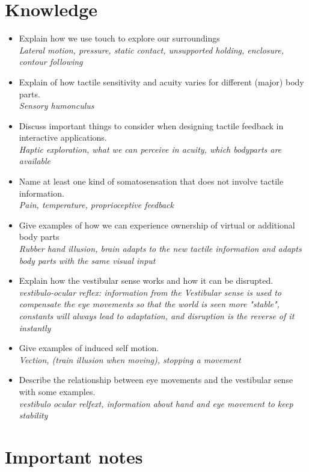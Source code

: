 \documentclass{article}
\begin{document}
\section{Knowledge}
\begin{itemize}
    \item Explain how we use touch to explore our surroundings\\
        \textit{Lateral motion, pressure, static contact, unsupported holding, enclosure, contour following}
    \item Explain of how tactile sensitivity and acuity varies for different (major) body parts.\\
        \textit{Sensory humonculus}
    \item Discuss important things to consider when designing tactile feedback in interactive applications.\\
        \textit{Haptic exploration, what we can perceive in acuity, which bodyparts are available}
    \item Name at least one kind of somatosensation that does not involve tactile information.\\
        \textit{Pain, temperature, proprioceptive feedback}
    \item Give examples of how we can experience ownership of virtual or additional body parts\\
        \textit{Rubber hand illusion, brain adapts to the new tactile information and adapts body parts with the same visual input}
    \item Explain how the vestibular sense works and how it can be disrupted.\\
        \textit{vestibulo-ocular reflex: information from the Vestibular sense is used to compensate the eye movements so that the world is seen more "stable", constants will always lead to adaptation, and disruption is the reverse of it instantly}
    \item Give examples of induced self motion.\\
        \textit{Vection, (train illusion when moving), stopping a movement}
    \item Describe the relationship between eye movements and the vestibular sense with some examples.\\
        \textit{vestibulo ocular relfext, information about hand and eye movement to keep stability}
\end{itemize}

\section{Important notes}
\end{document}
